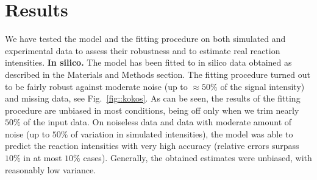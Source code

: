\documentclass{llncs}
\begin{document}
        \section{Results}
        We have tested the model and the fitting procedure on both simulated and experimental data to assess their robustness and to estimate real reaction intensities.
%
        \textbf{In silico.} The model has been fitted to in silico data obtained as described in the Materials and Methods section. The fitting procedure turned out to be fairly robust against moderate noise (up to $ \approx 50\%$ of the signal intensity) and missing data, see Fig.~\ref{fig::kokos}. As can be seen, the results of the fitting procedure are unbiased in most conditions, being off only when we trim nearly $50\%$ of the input data. On noiseless data and data with moderate amount of noise (up to $50\%$ of variation in simulated intensities), the model was able to predict the reaction intensities with very high accuracy (relative errors surpass $10\%$ in at most $10\%$ cases). Generally, the obtained estimates were unbiased, with reasonably low variance.
\end{document}
